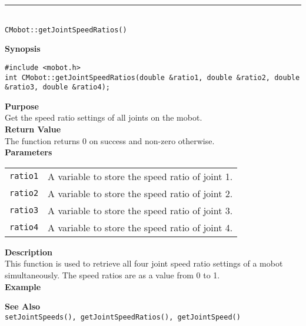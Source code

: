 \noindent
\vspace{5pt}
\rule{4.5in}{0.015in}\\
\noindent
{\LARGE \texttt{CMobot::getJointSpeedRatios()}}\\
{}

\noindent
{\bf Synopsis}
\vspace{-8pt}
\begin{verbatim}
#include <mobot.h>
int CMobot::getJointSpeedRatios(double &ratio1, double &ratio2, double &ratio3, double &ratio4);
\end{verbatim}

\noindent
{\bf Purpose}\\
Get the speed ratio settings of all joints on the mobot.\\

\noindent
{\bf Return Value}\\
The function returns 0 on success and non-zero otherwise.\\

\noindent
{\bf Parameters}
\vspace{-0.1in}
\begin{description}
\item               
\begin{tabular}{p{10 mm}p{145 mm}}
\texttt{ratio1} & A variable to store the speed ratio of joint 1.\\
\texttt{ratio2} & A variable to store the speed ratio of joint 2.\\
\texttt{ratio3} & A variable to store the speed ratio of joint 3.\\
\texttt{ratio4} & A variable to store the speed ratio of joint 4.\\
\end{tabular}
\end{description}

\noindent
{\bf Description}\\
This function is used to retrieve all four joint speed ratio settings of a mobot
simultaneously. The speed ratios are as a value from 0 to 1. \\

\noindent
{\bf Example}\\
\noindent

\noindent
{\bf See Also}\\
\texttt{setJointSpeeds(), getJointSpeedRatios(), getJointSpeed()}

